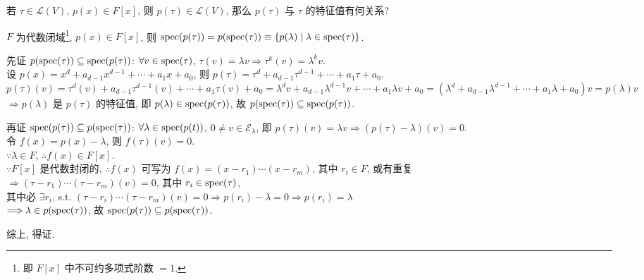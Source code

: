 \documentclass{note}
\begin{document}
若 $\tau\in\mathcal{L}(V)$, $p(x)\in F[x]$, 则 $p(\tau)\in\mathcal{L}(V)$, 那么 $p(\tau)$ 与 $\tau$ 的特征值有何关系?

\begin{thm}
    $F$ 为代数闭域\footnote{即 $F[x]$ 中不可约多项式阶数 $=1$.}, $p(x)\in F[x]$, 则 $\operatorname{spec}(p(\tau))=p(\operatorname{spec}(\tau))\equiv\{p(\lambda)\mid\lambda\in\operatorname{spec}(\tau)\}$.
\end{thm}
\begin{pf}
    先证 $p(\operatorname{spec}(\tau))\subseteq\operatorname{spec}(p(\tau))$: $\forall v\in\operatorname{spec}(\tau)$, $\tau(v)=\lambda v\Longrightarrow\tau^k(v)=\lambda^kv$.\\
    设 $p(x)=x^d+a_{d-1}x^{d-1}+\cdots+a_1x+a_0$, 则 $p(\tau)=\tau^d+a_{d-1}\tau^{d-1}+\cdots+a_1\tau+a_0$.\\
    $p(\tau)(v)=\tau^d(v)+a_{d-1}\tau^{d-1}(v)+\cdots+a_1\tau(v)+a_0=\lambda^dv+a_{d-1}\lambda^{d-1}v+\cdots+a_1\lambda v+a_0=(\lambda^d+a_{d-1}\lambda^{d-1}+\cdots+a_1\lambda+a_0)v=p(\lambda)v$\\
    $\Longrightarrow p(\lambda)$ 是 $p(\tau)$ 的特征值, 即 $p(\lambda)\in\operatorname{spec}(p(\tau))$, 故 $p(\operatorname{spec}(\tau))\subseteq\operatorname{spec}(p(\tau))$.

    再证 $\operatorname{spec}(p(\tau))\subseteq p(\operatorname{spec}(\tau))$: $\forall\lambda\in\operatorname{spec}(p(t))$, $0\neq v\in\mathcal{E}_{\lambda}$, 即 $p(\tau)(v)=\lambda v\Longrightarrow(p(\tau)-\lambda)(v)=0$.\\
    令 $f(x)=p(x)-\lambda$, 则 $f(\tau)(v)=0$.\\
    $\because\lambda\in F$, $\therefore f(x)\in F[x]$.\\
    $\because F[x]$ 是代数封闭的, $\therefore f(x)$ 可写为 $f(x)=(x-r_1)\cdots(x-r_m)$, 其中 $r_i\in F$, 或有重复\\
    $\Longrightarrow(\tau-r_1)\cdots(\tau-r_m)(v)=0$, 其中 $r_i\in\operatorname{spec}(\tau)$,\\
    其中必 $\exists r_i$, s.t. $(\tau-r_i)\cdots(\tau-r_m)(v)=0\Longrightarrow p(r_i)-\lambda=0\Longrightarrow p(r_i)=\lambda$\\
    $\Longrightarrow\lambda\in p(\operatorname{spec}(\tau))$, 故 $\operatorname{spec}(p(\tau))\subseteq p(\operatorname{spec}(\tau))$.

    综上, 得证.
\end{pf}
\end{document}
